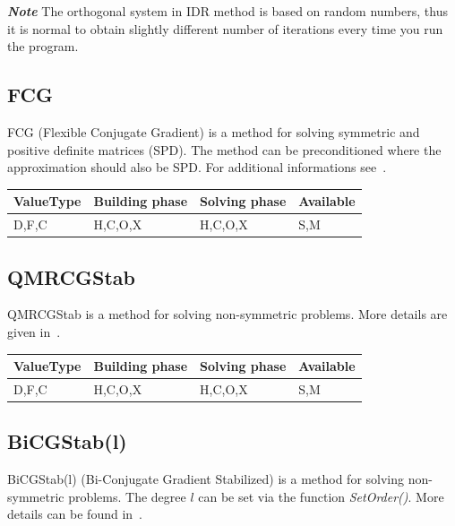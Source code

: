

\textbf{\emph{Note}} The orthogonal system in IDR method is based on random numbers, thus it is normal to obtain slightly different number of iterations every time you run the program.

\subsection{FCG}

FCG (Flexible Conjugate Gradient) is a method for solving symmetric and positive definite matrices (SPD). The method can be preconditioned where the approximation should also be SPD. For additional informations see~\cite{fcg}.

\begin{table}[H]
\begin{tabular}{l|l|l|l}
\multicolumn{1}{c|}{ValueType} & Building phase & Solving phase & Available \\ \hline
D,F,C                          & H,C,O,X        & H,C,O,X       & S,M      
\end{tabular}
\end{table}



\subsection{QMRCGStab}

QMRCGStab is a method for solving non-symmetric problems. More details are given in~\cite{qmrcgstab}.

\begin{table}[H]
\begin{tabular}{l|l|l|l}
\multicolumn{1}{c|}{ValueType} & Building phase & Solving phase & Available \\ \hline
D,F,C                          & H,C,O,X        & H,C,O,X       & S,M      
\end{tabular}
\end{table}



\subsection{BiCGStab(l)}

BiCGStab(l) (Bi-Conjugate Gradient Stabilized) is a method for solving non-symmetric problems. The degree $l$ can be set via the function \emph{SetOrder()}. More details can be found in~\cite{bicgstabl}.

